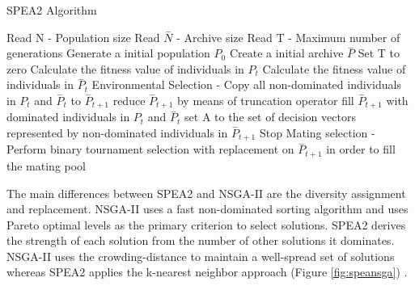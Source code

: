 \documentclass[espaco=umemeio,chapter=TITLE,twoside,openright]{abnt}
\begin{document}
\begin{algorithm}[h]
  \caption{SPEA2 Algorithm \cite{Zitzler2001}}\label{spea2}
  \begin{algorithmic}[1]

    \State Read N - Population size
    \State Read $ \overset{-}{N}$ - Archive size
    \State Read T - Maximum number of generations
    \State Generate a initial population $P_{0}$
    \State Create a initial archive $ \overset{-}{P} $
    \State Set T to zero
    \State Calculate the fitness value of individuals in $P_{t}$
    \State Calculate the fitness value of individuals in $\overset{-}{P}_{t}$
    \State Environmental Selection - Copy all non-dominated individuals in $P_{t}$ and $\overset{-}{P}_{t}$  to $\overset{-}{P}_{t+1}$
    \State reduce  $\overset{-}{P}_{t+1}$ by means of truncation operator
    \State fill $\overset{-}{P}_{t+1}$ with dominated individuals in $P_{t}$ and $\overset{-}{P}_{t}$
    \EndIf
    \State set A to the set of decision vectors represented by non-dominated individuals in $\overset{-}{P}_{t+1}$
    \State Stop
    \EndIf
    \State Mating selection - Perform binary tournament selection with replacement on $\overset{-}{P}_{t+1}$ in order to fill the mating pool
  \end{algorithmic}
\end{algorithm}

The main differences between SPEA2 and NSGA-II are the diversity assignment and replacement. NSGA-II uses a fast non-dominated sorting algorithm and uses Pareto optimal levels as the primary criterion to select solutions. SPEA2 derives the strength of each solution from the number of other solutions it dominates. NSGA-II uses the crowding-distance to maintain a well-spread set of solutions whereas SPEA2 applies the k-nearest neighbor approach (Figure \ref{fig:speansga}) \cite{Tervonen2017} \cite{Deb2005}.
\end{document}
